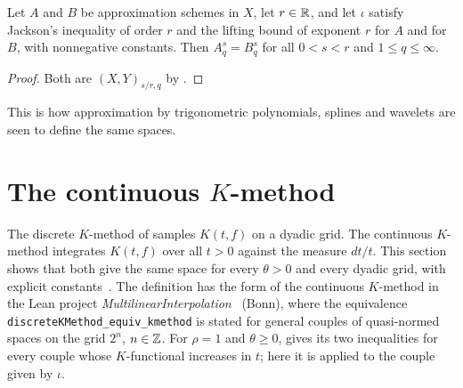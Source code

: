 \begin{corollary}
\label{cor:equal-spaces}
\leanok
{}
Let $A$ and $B$ be approximation schemes in $X$, let $r \in \mathbb{R}$, and let $\iota$ satisfy
Jackson's inequality of order $r$ and the lifting bound of exponent $r$ for $A$ and for $B$,
with nonnegative constants. Then $A^s_q = B^s_q$ for all $0 < s < r$ and
$1 \leq q \leq \infty$.
\end{corollary}

\begin{proof}
\leanok
Both are $(X, Y)_{s/r, q}$ by .
\end{proof}

This is how approximation by trigonometric polynomials, splines and wavelets are seen to
define the same spaces.

\section{The continuous \texorpdfstring{$K$}{K}-method}
\label{sec:continuous-k-method}

The discrete $K$-method of  samples $K(t, f)$ on a dyadic grid. The
continuous $K$-method integrates $K(t, f)$ over all $t > 0$ against the measure $dt/t$. This
section shows that both give the same space for every $\theta > 0$ and every dyadic grid, with
explicit constants~\cite[Lemma~3.1.3]{BerghLofstrom}. The definition has the form of the
continuous $K$-method in the Lean project
\emph{MultilinearInterpolation}~\cite{MultilinearInterpolation} (Bonn), where the
equivalence \texttt{discreteKMethod\_\allowbreak equiv\_\allowbreak kmethod} is stated for
general couples of quasi-normed spaces on the grid $2^n$, $n \in \mathbb{Z}$. For $\rho = 1$ and
$\theta \geq 0$,  gives its two inequalities for every
couple whose $K$-functional increases in $t$; here it is applied to the couple given by $\iota$.

